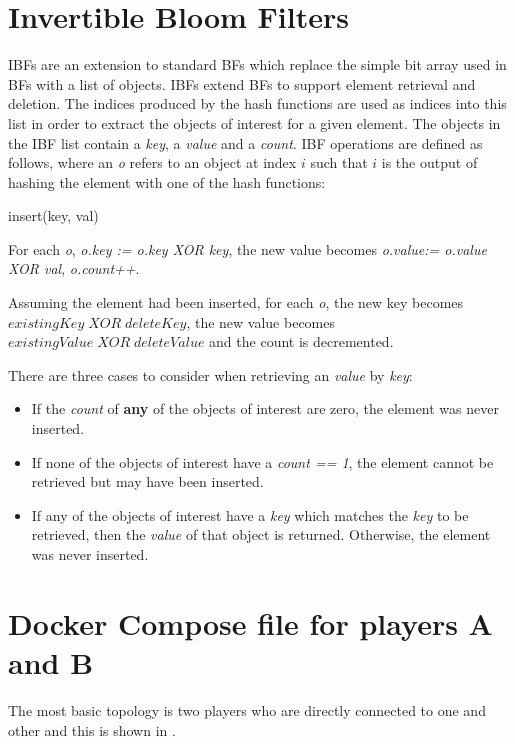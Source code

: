 \begin{appendices}

\chapter{Invertible Bloom Filters}\label{app:IBF}


IBFs are an extension to standard BFs which replace the simple bit array used in BFs with a list of objects. IBFs extend BFs to support element retrieval and deletion. The indices produced by the hash functions are used as indices into this list in order to extract the objects of interest for a given element. The objects in the IBF list contain a \textit{key}, a \textit{value} and a \textit{count}. IBF operations are defined as follows, where an \textit{o} refers to an object at index $i$ such that $i$ is the output of hashing the element with one of the hash functions:

\begin{labeling}{insert(key, val)  }
    \item[\textit{insert(key, val)}] For each \textit{o}, \textit{o.key := o.key XOR key}, the new value becomes \textit{o.value:= o.value XOR val}, \textit{o.count++}. 
    \item[\textit{delete(key)}] Assuming the element had been inserted, for each \textit{o}, the new key becomes $existingKey\;XOR\;deleteKey$, the new value becomes $existingValue\;XOR\;deleteValue$ and the count is decremented.
    \item[\textit{get(key)}] There are three cases to consider when retrieving an \textit{value} by \textit{key}:
    \begin{itemize}
        \item If the \textit{count} of \textbf{any} of the objects of interest are zero, the element was never inserted. 
        \item If none of the objects of interest have a \textit{count == 1}, the element cannot be retrieved but may have been inserted. \item If any of the objects of interest have a \textit{key} which matches the \textit{key} to be retrieved, then the \textit{value} of that object is returned. Otherwise, the element was never inserted.
    \end{itemize}
\end{labeling}





\chapter{Docker Compose file for players A and B}\label{app:docker-two-players}
The most basic topology is two players who are directly connected to one and other and this is shown in . 


\end{appendices}
